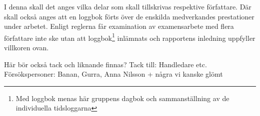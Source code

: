 \documentclass[../rapport_MVEX01-11-05]{subfiles}
\begin{document}
I denna skall det anges vilka delar som skall tillskrivas respektive
författare. Där skall också anges att en loggbok förts över de
enskilda medverkandes prestationer under arbetet.
Enligt reglerna får examination av examensarbete med flera författare
inte ske utan att loggbok\footnote{Med loggbok menas här gruppens
dagbok och sammanställning av de individuella tidsloggarna} inlämnats
och rapportens inledning uppfyller villkoren ovan.

Här bör också tack och liknande finnas?
Tack till:
Handledare etc.
Försökspersoner: Banan, Gurra, Anna Nilsson + några vi kanske glömt
\end{document}
